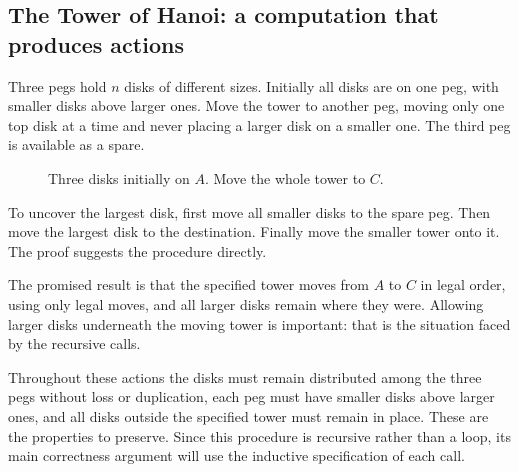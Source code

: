 \subsection{The Tower of Hanoi: a computation that produces actions}

Three pegs hold $n$ disks of different sizes. Initially all disks are on
one peg, with smaller disks above larger ones. Move the tower to another
peg, moving only one top disk at a time and never placing a larger disk
on a smaller one. The third peg is available as a spare.

\begin{figure}[ht]
\centering
{}
\caption{Three disks initially on $A$. Move the whole tower to $C$.}
\end{figure}

To uncover the largest disk, first move all smaller disks to the spare
peg. Then move the largest disk to the destination. Finally move the
smaller tower onto it. The proof suggests the procedure directly.

The promised result is that the specified tower moves from $A$ to $C$
in legal order, using only legal moves, and all larger disks remain where
they were. Allowing larger disks underneath the moving tower is important:
that is the situation faced by the recursive calls.

Throughout these actions the disks must remain distributed among the
three pegs without loss or duplication, each peg must have smaller disks
above larger ones, and all disks outside the specified tower must remain
in place. These are the properties to preserve. Since this procedure is
recursive rather than a loop, its main correctness argument will use the
inductive specification of each call.

